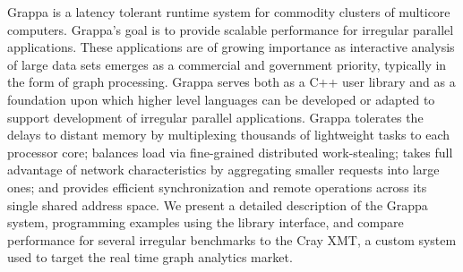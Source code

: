 Grappa is a latency tolerant runtime system for commodity clusters of
multicore computers. Grappa's goal is to provide scalable performance for
irregular parallel applications. These applications are of growing importance
as interactive analysis of large data sets emerges as a commercial and
government priority, typically in the form of graph processing. Grappa serves
both as a C++ user library and as a foundation upon which higher level
languages can be developed or adapted to support development of irregular
parallel applications. Grappa tolerates the delays to distant memory by
multiplexing thousands of lightweight tasks to each processor core; balances
load via fine-grained distributed work-stealing; takes full advantage of
network characteristics by aggregating smaller requests into large ones; and
provides efficient synchronization and remote operations across its single
shared address space. We present a detailed description of the Grappa system,
programming examples using the library interface, and compare performance for
several irregular benchmarks to the Cray XMT, a custom system used to target
the real time graph analytics market.